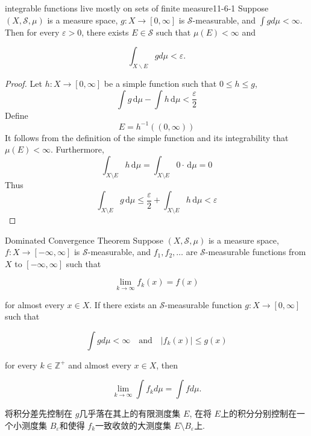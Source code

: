 \documentclass[../main.tex]{subfiles}
\begin{document}
\begin{proposition}{integrable functions live mostly on sets of finite measure}{11-6-1}
Suppose $(X, \mathcal{S}, \mu)$ is a measure space, $g: X \to [0, \infty]$ is $\mathcal{S}$-measurable, and $\int g d\mu < \infty$. Then for every $\varepsilon > 0$, there exists $E \in \mathcal{S}$ such that $\mu(E) < \infty$ and

\[
\int_{X \backslash E} g d\mu < \varepsilon.
\]
\end{proposition}
\begin{proof}
   Let \(  h :X\to \left[ 0,\infty \right]  \) be a simple function such that \(  0\le h\le g  \), \[
   \int g\,\mathrm{d} \mu - \int h\,\mathrm{d} \mu < \frac{ \varepsilon  }{2 } 
   \] Define \[
   E=  h^{-1} \left( \left( 0,\infty \right)  \right) 
   \]  It follows from the definition of the simple function and its integrability that \(  \mu \left( E \right)< \infty   \). Furthermore, \[
   \int_{X\setminus E}h \,\mathrm{d} \mu = \int_{X\setminus E} 0\cdot  \,\mathrm{d} \mu = 0
   \] Thus \[
   \int_{X\setminus E}g\,\mathrm{d} \mu\le \frac{ \varepsilon  }{2 }+ \int_{ X\setminus E} h \,\mathrm{d} \mu <  \varepsilon 
   \]
\end{proof}
\begin{theorem}{Dominated Convergence Theorem}{}
Suppose $(X, \mathcal{S}, \mu)$ is a measure space, $f: X \to [-\infty, \infty]$ is $\mathcal{S}$-measurable, and $f_1, f_2, \ldots$ are $\mathcal{S}$-measurable functions from $X$ to $[-\infty, \infty]$ such that

\[
\lim_{k \to \infty} f_k(x) = f(x)
\]

for almost every $x \in X$. If there exists an $\mathcal{S}$-measurable function $g: X \to [0, \infty]$ such that

\[
\int g d\mu < \infty \quad \text{and} \quad |f_k(x)| \leq g(x)
\]

for every $k \in \mathbb{Z}^+$ and almost every $x \in X$, then

\[
\lim_{k \to \infty} \int f_k d\mu = \int f d\mu.
\]
\end{theorem}
\begin{proofsketch}
   将积分差先控制在  \(  g  \)几乎落在其上的有限测度集 \(  E  \),    在将 \(  E  \)上的积分分别控制在一个小测度集 \(  B_{ \varepsilon }  \)和使得  \(  f_{k}  \)一致收敛的大测度集 \(  E\setminus B_{ \varepsilon }  \)上.  
\end{proofsketch}
\end{document}
